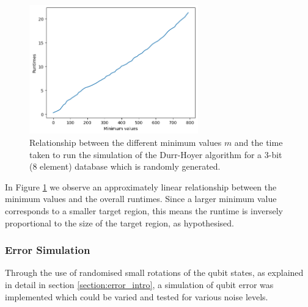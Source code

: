\documentclass{article}[11pt]
\begin{document}
\begin{figure}[H]
\centering
\includegraphics[width=0.65\textwidth]{Pictures/runtime2plot.png}
\caption{Relationship between the different minimum values $m$ and the time taken to run the simulation of the Durr-Hoyer algorithm for a 3-bit (8 element) database which is randomly generated.}
\label{fig:runtime2}
\end{figure}

In Figure \ref{fig:runtime2} we observe an approximately linear relationship between the minimum values and the overall runtimes. Since a larger minimum value corresponds to a smaller target region, this means the runtime is inversely proportional to the size of the target region, as hypothesised.

\subsubsection{Error Simulation}
Through the use of randomised small rotations of the qubit states, as explained in detail in section \ref{section:error_intro}, a simulation of qubit error was implemented which could be varied and tested for various noise levels.
\end{document}
